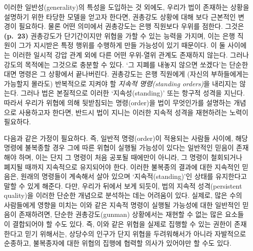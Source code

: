 \documentclass[12pt, oneside]{book}  %
\begin{document}
이러한 일반성(generality)의 특성을 도입하는 것 외에도, 우리가 법이
존재하는 상황을 설명하기 위한 타당한 모델을 얻고자 한다면, 권총강도 상황에
대해 보다 근본적인 변경이 필요하다. 물론 어떤 의미에서 권총강도는 은행
직원보다 우위를 점한다. 그것은 \textbf{(p.~23)} 권총강도가 단기간이지만
위협을 가할 수 있는 능력을 가지며, 이는 은행 직원이 그가 지시받은 특정
행위를 수행하게 만들 가능성이 있기 때문이다. 이 둘 사이에는 이러한
일시적 강압 관계 외에 다른 어떤 우위-열위 관계도 존재하지 않는다. 그러나
강도의 목적에는 그것으로 충분할 수 있다. `그 지폐를 내놓지 않으면
쏘겠다'는 단순한 대면 명령은 그 상황에서 끝나버린다. 권총강도는 은행
직원에게 (자신의 부하들에게는 가능할지 몰라도) 반복적으로 지켜야 할
\emph{지속적 명령(standing orders)}을 내리지는 않는다. 그러나 법은
본질적으로 이러한 `지속성(standing)' 또는 항구적 성격을 지닌다. 따라서
우리가 위협에 의해 뒷받침되는 명령(order)을 법이 무엇인가를 설명하는
개념으로 사용하고자 한다면, 반드시 법이 지니는 이러한 지속적 성격을
재현하려는 노력이 필요하다.

다음과 같은 가정이 필요하다. 즉, 일반적 명령(order)이 적용되는 사람들
사이에, 해당 명령에 불복종할 경우 그에 따른 위협이 실행될 가능성이
있다는 일반적인 믿음이 존재해야 하며, 이는 단지 그 명령이 처음 공포될
때에만이 아니라, 그 명령이 철회되거나 폐지될 때까지 지속적으로
유지되어야 한다. 이러한 불복종의 결과에 대한 지속적인 믿음은, 원래의
명령들이 계속해서 살아 있으며 `지속적(standing)'인 상태를 유지한다고
말할 수 있게 해준다. 다만, 우리가 뒤에서 보게 되듯이, 법의 지속적
성격(persistent quality)을 이러한 단순한 개념으로 분석하는 데는 어려움이
있다. 실제로, 많은 수의 사람들에게 영향을 미치는 이와 같은 지속적 명령이
실행될 가능성에 대한 일반적인 믿음이 존재하려면, 단순한 권총강도(gunman)
상황에서는 재현할 수 없는 많은 요소들이 결합되어야 할 수도 있다. 즉,
이와 같은 위협을 실제로 집행할 수 있는 권한이 존재한다고 믿기 위해서는,
상당수의 인구가 단지 위협을 두려워해서가 아니라 자발적으로 순종하고,
불복종자에 대한 위협의 집행에 협력할 의사가 있어야만 할 수도 있다.
\end{document}
